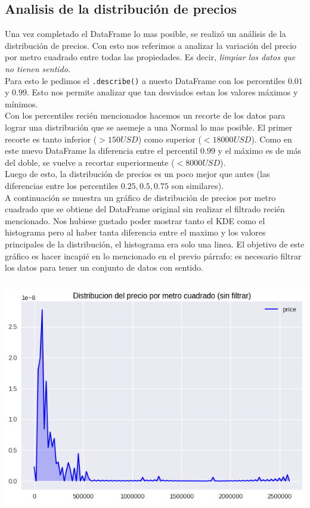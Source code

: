\documentclass[a4paper, 10pt]{article}
\def\code#1{\texttt{#1}}
\newcommand\tab[1][0.5cm]{\hspace*{#1}}
\begin{document}
			\subsection{Analisis de la distribución de precios}
				Una vez completado el DataFrame lo mas posible, se realizó un análisis de la distribución de precios.
				Con esto nos referimos a analizar la variación del precio por metro cuadrado entre todas las
				propiedades. Es decir, \emph{limpiar los datos que no tienen sentido}. \\
				\tab Para esto le pedimos el \code{.describe()} a nuesto DataFrame con los percentiles $0.01$ y
				$0.99$. Esto nos permite analizar que tan desviados estan los valores máximos y mínimos. \\
				\tab Con los percentiles recién mencionados hacemos un recorte de los datos para lograr una distribución
				que se asemeje a una Normal lo mas posible. El primer recorte es tanto inferior ($ > 150USD$) como superior
				($<18000USD$). Como en este nuevo DataFrame la diferencia entre el percentil $0.99$ y el máximo es de más
				del doble, se vuelve a recortar superiormente ($<8000USD$). \\
				\tab Luego de esto, la distribución de precios es un poco mejor que antes (las diferencias entre los
				percentiles $0.25, 0.5, 0.75$ son similares). \\
				\tab A continuación se muestra un gráfico de distribución de precios por metro cuadrado que se obtiene
				del DataFrame original sin realizar el filtrado recién mencionado. Nos hubiese gustado poder mostrar tanto
				el KDE como el histograma pero al haber tanta diferencia entre el maximo y los valores principales de la
				distribución, el histograma era solo una linea. El objetivo de este gráfico es hacer incapié en lo mencionado
				en el previo párrafo: es necesario filtrar los datos para tener un conjunto de datos con sentido.
				\begin{center}
       				\includegraphics[width=6in, height=4in]{images/m2UnfilteredKDE}
		   		\end{center}
\end{document}
